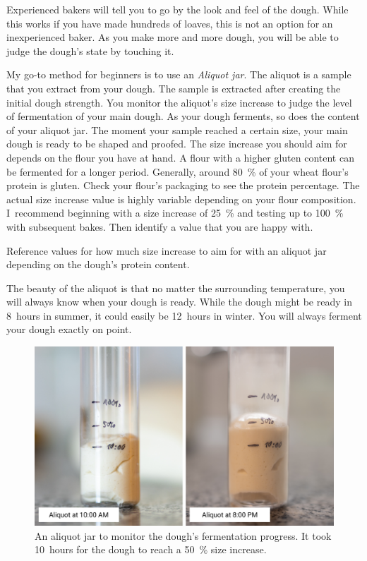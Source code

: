Experienced bakers will tell you to go by the look and feel of
the dough. While this works if you have made hundreds of loaves,
this is not an option for an inexperienced baker. As
you make more and more dough, you will be able to judge
the dough's state by touching it.

My go-to method for beginners is to use an \emph{Aliquot jar}.
The aliquot is a sample that you extract from your dough. The
sample is extracted after creating the initial dough strength.
You monitor the aliquot's size increase to judge the
level of fermentation of your main dough. As your
dough ferments, so does the content of your aliquot jar. The moment your
sample reached a certain size, your main dough is ready
to be shaped and proofed. The size increase you should
aim for depends on the flour you have at hand. A flour
with a higher gluten content can be fermented for a
longer period. Generally, around \qty{80}{\percent}
of your wheat flour's protein is gluten. Check your flour's
packaging to see the protein percentage. The actual size increase
value is highly variable depending on your flour composition.
I~recommend beginning with a size increase of \qty{25}{\percent} and testing
up to \qty{100}{\percent} with subsequent bakes. Then identify a value
that you are happy with.

\begin{table}[!htb]
    \centering
        
        \caption[Increase of size versus protein content]{Reference values for
            how much size increase to aim for with an aliquot jar depending on
            the dough's protein content.}
\end{table}

The beauty of the aliquot is that no matter the surrounding
temperature, you will always know when your dough is ready.
While the dough might be ready in 8~hours in summer, it could
easily be 12~hours in winter. You will always ferment your
dough exactly on point.


\begin{figure}[!htb]
  \centering
  \includegraphics[width=\textwidth]{aliquot-before-after}
  \caption[Aliquot Jar]{An aliquot jar to monitor the dough's fermentation
      progress.  It took 10~hours for the dough to reach a \qty{50}{\percent}
      size increase.}
\end{figure}

